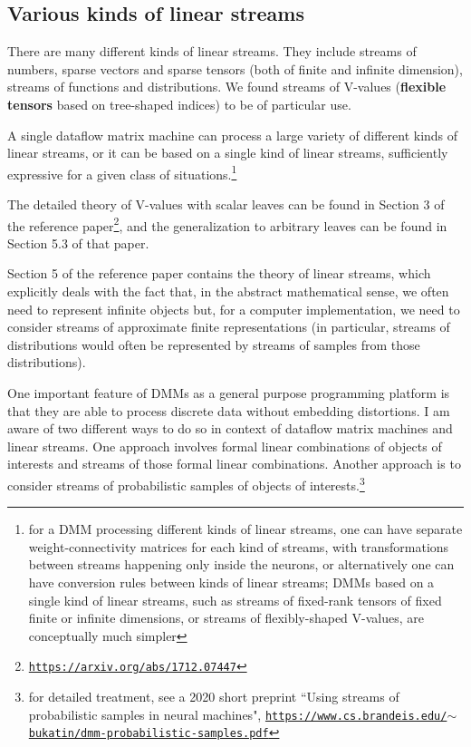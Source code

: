 \documentclass{article}
\begin{document}
\pagebreak

\subsection{Various kinds of linear streams}

There are many different kinds of linear streams. They include streams of numbers, sparse vectors and sparse tensors (both of
finite and infinite dimension), streams of functions and distributions. We found streams of V-values
({\bf flexible tensors} based on tree-shaped indices) to be of particular use.

A single dataflow matrix machine can process a large variety of different kinds of linear streams, or
it can be based on a single kind of linear streams, sufficiently expressive for a given class of situations.\footnote{for a DMM
processing different kinds of linear streams, one can have separate weight-connectivity matrices for each kind
of streams, with transformations between streams happening only inside the neurons, or alternatively one can have conversion
rules between kinds of linear streams; DMMs based on a single kind of linear streams, such as streams of
fixed-rank tensors of fixed finite or infinite dimensions, or streams of flexibly-shaped V-values, are conceptually much simpler}

The detailed theory of V-values with scalar leaves can be found in Section 3 of
the reference paper\footnote{\href{https://arxiv.org/abs/1712.07447}{\tt https://arxiv.org/abs/1712.07447}}, 
and the generalization to arbitrary leaves can be found in Section 5.3 of that paper.

Section 5 of the reference paper contains the theory of linear streams, which explicitly deals with the fact that, 
in the abstract mathematical sense, we often need to represent infinite objects but, for a computer implementation, 
we need to consider streams of approximate finite representations (in particular, streams of distributions
would often be represented by streams of samples from those distributions).

One important feature of DMMs as a general purpose programming platform
is that they are able to process discrete data without embedding distortions.
I am aware of two different ways to do so in context of dataflow matrix machines and linear streams.
One approach involves formal linear combinations of objects of interests and streams of
those formal linear combinations. Another approach is to consider streams of probabilistic
samples of objects of interests.\footnote{for detailed treatment, see a 2020 short preprint 
``Using streams of probabilistic samples in neural machines",
\href{https://www.cs.brandeis.edu/~bukatin/dmm-probabilistic-samples.pdf}
{\tt https://www.cs.brandeis.edu/$\sim$bukatin/dmm-probabilistic-samples.pdf}}
\end{document}
